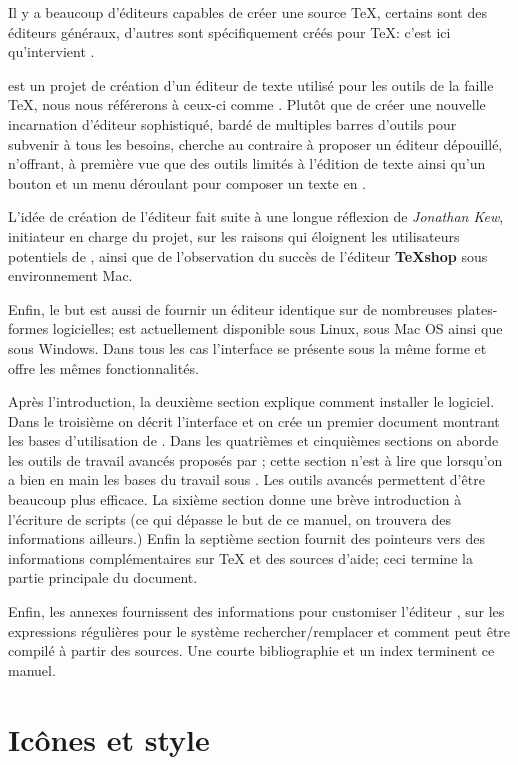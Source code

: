 Il y a beaucoup d'éditeurs capables de créer une source \TeX, certains sont des éditeurs généraux, d'autres sont spécifiquement créés pour \TeX: c'est ici qu'intervient \Tw{}.
\bigskip

\Tw{} est un projet de création d'un éditeur de texte utilisé pour les outils de la faille \TeX, nous nous référerons à ceux-ci comme \AllTeX. Plutôt que de créer une nouvelle incarnation d'éditeur sophistiqué, bardé de multiples barres d'outils pour subvenir à tous les besoins, \Tw{} cherche au contraire à proposer un éditeur dépouillé, n'offrant, à première vue que des outils limités à l'édition de texte ainsi qu'un bouton et un menu déroulant pour composer un texte en \AllTeX.

L'idée de création de l'éditeur fait suite à une longue réflexion de \emph{Jonathan Kew}, initiateur en charge du projet, sur les raisons qui éloignent les utilisateurs potentiels de \AllTeX, ainsi que de l'observation du succès de l'éditeur \textbf{\TeX shop} sous environnement Mac.

Enfin, le but est aussi de fournir un éditeur identique sur de nombreuses plates-formes logicielles; \Tw{} est actuellement disponible sous Linux, sous Mac OS ainsi que sous Windows. Dans tous les cas l'interface se présente sous la même forme et offre les mêmes fonctionnalités.

Après l'introduction, la deuxième section explique comment installer le logiciel. Dans le troisième on décrit l'interface et on crée un premier document montrant les bases d'utilisation de \Tw. Dans les quatrièmes et cinquièmes sections on aborde les outils de travail avancés proposés par \Tw{}; cette section n'est à lire que lorsqu'on a bien en main les bases du travail sous \Tw{}. Les outils avancés permettent d'être beaucoup plus efficace. La sixième section donne une brève introduction à l'écriture de scripts (ce qui dépasse le but de ce manuel, on trouvera des informations ailleurs.) Enfin la septième section fournit des pointeurs vers des informations complémentaires sur \TeX{} et des sources d'aide; ceci termine la partie principale du document.

Enfin, les annexes fournissent des informations pour \og customiser\fg{} l'éditeur \Tw, sur les expressions régulières pour le système rechercher/remplacer et comment \Tw{} peut être compilé à partir des sources. Une courte bibliographie et un index terminent ce manuel.

\section{Icônes et style}

